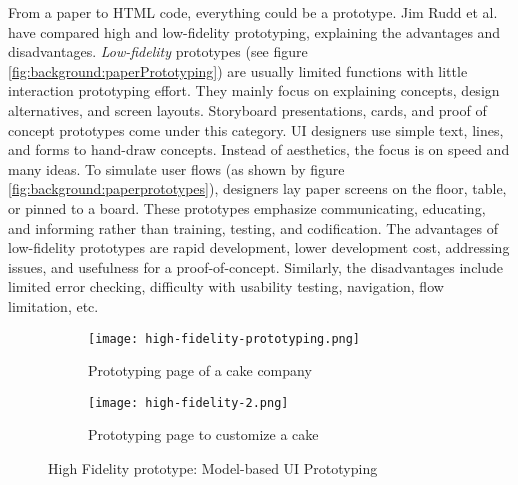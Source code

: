 From a paper to HTML code, everything could be a prototype.
Jim Rudd et al. \cite{article:prototyping:highlowfidelity} have compared high and low-fidelity prototyping, explaining the advantages and disadvantages.
\textit{Low-fidelity} prototypes (see figure \ref{fig:background:paperPrototyping}) are usually limited functions with little interaction prototyping effort. They mainly focus on explaining concepts, design alternatives, and screen layouts. 
Storyboard presentations, cards, and proof of concept prototypes come under this category.
UI designers use simple text, lines, and forms to hand-draw concepts. 
Instead of aesthetics, the focus is on speed and many ideas.
To simulate user flows (as shown by figure \ref{fig:background:paperprototypes}), designers lay paper screens on the floor, table, or pinned to a board.
These prototypes emphasize communicating, educating, and informing rather than training, testing, and codification.
The advantages of low-fidelity prototypes are rapid development, lower development cost, addressing issues, and usefulness for a proof-of-concept.
Similarly, the disadvantages include limited error checking, difficulty with usability testing, navigation, flow limitation, etc.
\begin{figure}[htbp]
  \begin{subfigure}[b]{0.5\textwidth}
    \centering
    \texttt{[image: high-fidelity-prototyping.png]}
    \caption{Prototyping page of a cake company}
    \label{fig:background:high1}   
  \end{subfigure}
  \begin{subfigure}[b]{0.5\textwidth}
    \centering
    \texttt{[image: high-fidelity-2.png]}
    \caption{Prototyping page to customize a cake}
    \label{fig:background:high2}   
  \end{subfigure} 
  \caption[High Fidelity prototyping]{High Fidelity prototype: Model-based UI Prototyping \cite{misc:prototyping:hfp}}
  \label{fig:background:uiPrototyping}
\end{figure}

